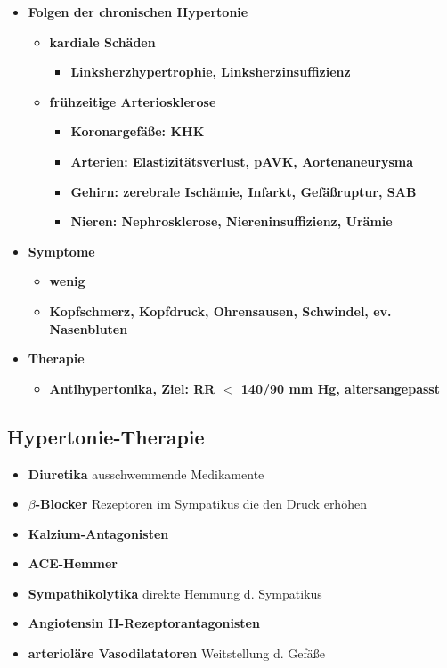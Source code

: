 \begin{itemize}
\begin{itemize}
\begin{itemize}
						\end{itemize}
					\item \textbf{Folgen der chronischen Hypertonie}
						\begin{itemize}
							\item \textbf{kardiale Schäden}
								\begin{itemize}
									\item \textbf{Linksherzhypertrophie, Linksherzinsuffizienz}
								\end{itemize}
							\item \textbf{frühzeitige Arteriosklerose}
								\begin{itemize}
									\item \textbf{Koronargefäße: KHK}
									\item \textbf{Arterien: Elastizitätsverlust, pAVK, Aortenaneurysma}
									\item \textbf{Gehirn: zerebrale Ischämie, Infarkt, Gefäßruptur, SAB}
									\item \textbf{Nieren: Nephrosklerose, Niereninsuffizienz, Urämie}
								\end{itemize}
						\end{itemize}
					\item \textbf{Symptome}
						\begin{itemize}
							\item \textbf{wenig}
							\item \textbf{Kopfschmerz, Kopfdruck, Ohrensausen, Schwindel, ev. Nasenbluten}
						\end{itemize}
					\item \textbf{Therapie}
						\begin{itemize}
							\item \textbf{Antihypertonika, Ziel: RR $<$ 140/90 mm Hg, altersangepasst}
						\end{itemize}
				\end{itemize}
		\end{itemize}
	\subsection{Hypertonie-Therapie}
		\begin{itemize}
			\item \textbf{Diuretika} ausschwemmende Medikamente
			\item \textbf{$\beta$-Blocker} Rezeptoren im Sympatikus die den Druck erhöhen
			\item \textbf{Kalzium-Antagonisten}
			\item \textbf{ACE-Hemmer}
			\item \textbf{Sympathikolytika} direkte Hemmung d. Sympatikus
			\item \textbf{Angiotensin II-Rezeptorantagonisten}
			\item \textbf{arterioläre Vasodilatatoren} Weitstellung d. Gefäße
		\end{itemize}
